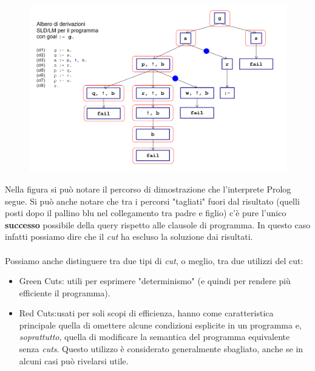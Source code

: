 \documentclass[11pt]{article}
\begin{document}
\begin{figure}[H]
\label{Albero sintattico che mostra il funzionamento del predicato cut}
\includegraphics[scale=0.35]{cut-albero-derivazioni.png}
\centering
\end{figure}

Nella figura si può notare il percorso di dimostrazione che l'interprete Prolog segue. Si può anche notare che tra i percorsi "tagliati" fuori dal risultato (quelli posti dopo il pallino blu nel collegamento tra padre e figlio) c'è pure l'unico \textbf{successo} possibile della query rispetto alle clausole di programma. In questo caso infatti possiamo dire che il \textit{cut} ha escluso la soluzione dai risultati.
\\ \\
Possiamo anche distinguere tra due tipi di \textit{cut}, o meglio, tra due utilizzi del cut:
\begin{itemize}
	\item \color{green} Green Cuts\color{black}: utili per esprimere "determinismo" (e quindi per rendere più efficiente il programma).
	\item \color{red} Red Cuts\color{black}:usati per soli scopi di efficienza, hanno come caratteristica principale quella di omettere alcune condizioni esplicite in un programma e, \textit{soprattutto}, quella di modificare la semantica del programma equivalente senza \textit{cuts}. Questo utilizzo è considerato generalmente sbagliato, anche se in alcuni casi può rivelarsi utile.
\end{itemize}
\end{document}
